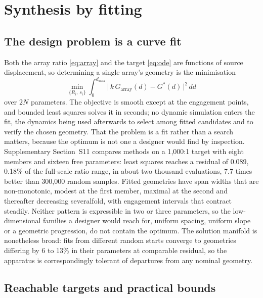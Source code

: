 \documentclass[preprint,12pt,number]{elsarticle}
\newcommand{\Garr}{G_{\mathrm{array}}}
\newcommand{\Gstar}{G^{*}}
\newcommand{\dmax}{d_{\max}}
\begin{document}
\section{Synthesis by fitting}
\label{sec:synth}

\subsection{The design problem is a curve fit}
\label{sec:fit}

Both the array ratio \eqref{eq:array} and the target \eqref{eq:ode} are functions of source displacement, so determining a single array's geometry is the minimisation
\begin{equation}
\min_{\{R_i,\,s_i\}} \int_0^{\dmax} \bigl|\, k\,\Garr(d) - \Gstar(d) \,\bigr|^2\, dd
\label{eq:single-obj}
\end{equation}
over $2N$ parameters. The objective is smooth except at the engagement points, and bounded least squares solves it in seconds; no dynamic simulation enters the fit, the dynamics being used afterwards to select among fitted candidates and to verify the chosen geometry. That the problem is a fit rather than a search matters, because the optimum is not one a designer would find by inspection. Supplementary Section~S11 compares methods on a 1,000:1 target with eight members and sixteen free parameters: least squares reaches a residual of 0.089, 0.18\% of the full-scale ratio range, in about two thousand evaluations, 7.7 times better than 300,000 random samples. Fitted geometries have span widths that are non-monotonic, modest at the first member, maximal at the second and thereafter decreasing severalfold, with engagement intervals that contract steadily. Neither pattern is expressible in two or three parameters, so the low-dimensional families a designer would reach for, uniform spacing, uniform slope or a geometric progression, do not contain the optimum. The solution manifold is nonetheless broad: fits from different random starts converge to geometries differing by 6 to 13\% in their parameters at comparable residual, so the apparatus is correspondingly tolerant of departures from any nominal geometry.

\subsection{Reachable targets and practical bounds}
\end{document}
